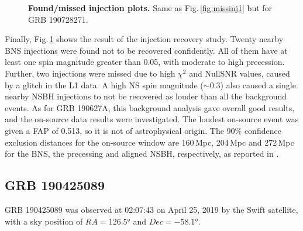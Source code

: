 \documentclass[binding=0.6cm, LaM]{sapthesis}
\begin{document}
        \begin{figure}[!t]
          \noindent
          \label{missinj2_3}
          \centering
          \caption{\textbf{Found/missed injection plots.} Same as Fig.\,\ref{fig:missinj1} but for GRB 190728271.}
          \label{fig:missinj2_3}
        \end{figure}

        Finally, Fig.\,\ref{fig:missinj2_3} shows the result of the injection recovery study.  Twenty nearby BNS injections were found not to be recovered confidently.
        All of them have at least one spin magnitude greater than 0.05, with moderate to high precession. 
	Further, two injections were missed due to high $\chi^2$ and NullSNR values, caused by a glitch in the L1 data.
	A high NS spin magnitude ($\sim 0.3$) also caused a single nearby NSBH injections to not be recovered as louder than all the background events.
        As for GRB 190627A, this background analysis gave overall good results,
	and the on-source data results were investigated.
	The loudest on-source event was given a FAP of 0.513, so it is not of astrophysical origin.  The $90\%$ confidence exclusion distances for the on-source window are 160\,Mpc, 204\,Mpc and 272\,Mpc for the BNS, the precessing and aligned NSBH, respectively, as reported in \cite{43}.

\subsection{GRB 190425089}
\label{sec:GRB190425089}
        GRB 190425089 was observed at 02:07:43 on April 25, 2019 by the Swift satellite,
        with a sky position of $RA=\ang{126.5}$ and $Dec=\ang{-58.1}$.
\end{document}
